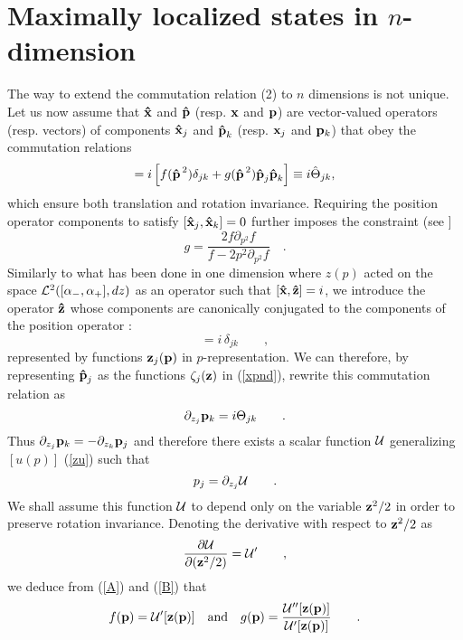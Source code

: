 \documentclass[a4paper,10pt]{article}
\newcommand{\x}{\mbox{\rm{\bf \^ x}}}
\newcommand{\p}{\mbox{\rm{\bf \^ p}}}
\newcommand{\z}{\mbox{\rm{\bf \^ z}}}
\newcommand{\bp}{\mbox{\rm{\bf p}}}
\newcommand{\bz}{\mbox{\rm{\bf z}}}
\newcommand{\xj}{\mbox{\rm{\bf \^ x}}_j}
\newcommand{\xk}{\mbox{\rm{\bf \^ x}}_k}
\newcommand{\pk}{\mbox{\rm{\bf \^ p}}_k}
\newcommand{\zk}{\mbox{\rm{\bf \^ z}}_k}
\newcommand{\pj}{\mbox{\rm{\bf \^ p}}_j}
\newcommand{\et}{\mbox{\rm{and}}}
\newcommand{\cU}{{\cal U}}
\newcommand{\cL}{{\cal L}}
\begin{document}
\section{Maximally localized states in $n$-dimension }
The way to extend the commutation relation (2) to $n$ dimensions
is not unique. Let us now assume that $\x$ and $\p$ (resp. $\bf x$
and $\bf p$) are vector-valued operators (resp. vectors) of
components $\xj$ and $\pk$ (resp. ${\bf x}_j$ and ${\bf p}_k$)
that obey the commutation relations
\begin{equation} [\x_j ,\pk] =
i \left[f(\p ^{\,2})\delta_{jk}+g(\p^{\,2}) \pj \pk \right] \equiv
i \hat \Theta_{jk} \label{xpnd} ,
\end{equation}
which ensure both translation and rotation invariance. Requiring
the position operator components to satisfy $[\x_j ,\xk]=0$
further imposes the constraint (see \cite{AK}]
\begin{equation}
g = \frac{2 f \partial_{p^2} f}{f-2 p^2 \partial_{p^2}f} \quad
.\label{tc}
\end{equation}
Similarly to what has been done in one dimension where $z(p)$
acted on the space ${\cL}^2([\alpha_-,\alpha_+],dz)$ as an
operator such that $[\x,\z] = i$, we introduce the operator $\z$
whose components are canonically conjugated to the components of
the position operator :
\begin{equation}
[\xj, \zk] = i \, \delta_{jk} \qquad , \label{xznd}
\end{equation}
represented by functions ${\bf z}_j ({\bf p})$ in
$p$-representation. We can therefore, by representing $\pj$ as the
functions $\zeta_j({\bf z})$ in (\ref{xpnd}), rewrite this
commutation relation as
\begin{equation}
\partial_{z_j}{\bf p}_k = i \Theta_{jk} \qquad .\label{A}
\end{equation}
Thus $\partial_{z_j}{\bf p}_k=-\partial_{z_k}{\bf p}_j $ and
therefore there exists a scalar function $\cU$ generalizing
$[u(p)]$ (\ref{zu}) such that
\begin{equation}
p_j = \partial_{z_j} \cU \qquad . \label{B}
\end{equation}
We shall assume this function $\cU$ to depend only on the variable
${\bf z}^2/2$ in order to preserve rotation invariance. Denoting
the derivative with respect to $\bz^2 /2$ as
\begin{equation}
\frac {\partial \cU}{\partial (\bz^2 /2)}=\cU ' \qquad ,
\end{equation}
we deduce from (\ref{A}) and (\ref{B}) that
\begin{equation}
f({\bp}) = {\cU}'[\bz(\bp)]\quad \et\quad g(\bp) = \frac{
{\cU}''[\bz(\bp)]} { {\cU}'[\bz(\bp)]} \qquad .
\end{equation}
\end{document}
